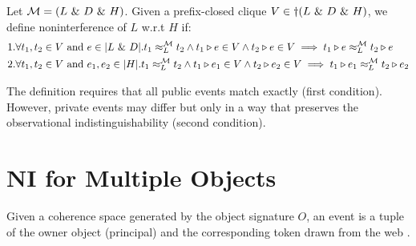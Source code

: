 \documentclass[acmsmall,screen,review, nonacm]{acmart}
\begin{document}
\medskip
    {
      \color{blue}
\begin{definition}\label{def:relaxninew}
   Let $\classpart = (L \directprod D \directprod H)$. Given a prefix-closed clique $V \in \dagger(L \directprod D \directprod H)$, we define noninterference of $L$ w.r.t $H$ if:
   \begin{align*}
     & 1. \forall t_1, t_2 \in V \text{ and }  e \in \abs{L \directprod D}. \treq{t_1}{t_2}{L}{\classpart}  \wedge t_1 \tracecat e \in V \wedge t_2 \tracecat  e \in V \implies \treq{t_1  \tracecat  e}{t_2 \tracecat  e}{L}{\classpart} \\
     & 2. \forall t_1, t_2 \in V \text{ and }  e_1, e_2 \in \abs{H}. \treq{t_1}{t_2}{L}{\classpart}  \wedge t_1 \tracecat e_1 \in V \wedge t_2 \tracecat  e_2 \in V \implies \treq{t_1  \tracecat  e_1}{t_2 \tracecat  e_2}{L}{\classpart}
   \end{align*}
\end{definition}
}

The definition requires that all public events match exactly (first condition). However, private events may differ but only in a way that preserves the observational indistinguishability (second condition).

    
\clearpage
\section{NI for Multiple Objects}


\begin{definition}
Given a coherence space generated by the object signature $O$, an event is a tuple of the owner object (principal) and the corresponding token drawn from the web .
\end{definition}
\end{document}
